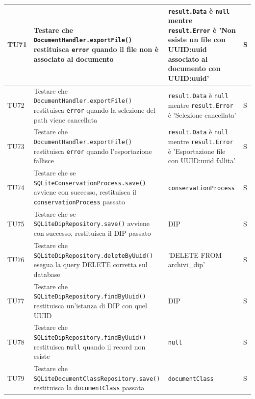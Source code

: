 \documentclass[a4paper,12pt]{article}
\begin{document}
\begin{longtable}{|M{1.2cm}|M{5cm}|M{7cm}|M{1.5cm}|}
            TU71 & Testare che \texttt{DocumentHandler.exportFile()} restituisca \texttt{error} quando il file non è associato al documento & \texttt{result.Data} è \texttt{null} mentre \texttt{result.Error} è 'Non esiste un file con UUID:uuid associato al documento con UUID:uuid' & S \\
            \hline

            TU72 & Testare che \texttt{DocumentHandler.exportFile()} restituisca \texttt{error} quando la selezione del path viene cancellata & \texttt{result.Data} è \texttt{null} mentre \texttt{result.Error} è 'Selezione cancellata' & S \\
            \hline

            TU73 & Testare che \texttt{DocumentHandler.exportFile()} restituisca \texttt{error} quando l'esportazione fallisce & \texttt{result.Data} è \texttt{null} mentre \texttt{result.Error} è 'Esportazione file con UUID:uuid fallita' & S \\
            \hline


            TU74 & Testare che se \texttt{SQLiteConservationProcess.save()} avviene con successo, restituisca il \texttt{conservationProcess} passato & \texttt{conservationProcess} & S \\
            \hline

            TU75 & Testare che se \texttt{SQLiteDipRepository.save()} avviene con successo, restituisca il DIP passato & DIP & S \\
            \hline

            TU76 & Testare che \texttt{SQLiteDipRepository.deleteByUuid()} esegua la query DELETE corretta sul database & 'DELETE FROM archivi\_dip' & S \\
            \hline

            TU77 & Testare che \texttt{SQLiteDipRepository.findByUuid()} restituisca un'istanza di DIP con quel UUID & DIP & S \\
            \hline

            TU78 & Testare che \texttt{SQLiteDipRepository.findByUuid()} restituisca \texttt{null} quando il record non esiste & \texttt{null} & S \\
            \hline

            TU79 & Testare che \texttt{SQLiteDocumentClassRepository.save()} restituisca la \texttt{documentClass} passata & \texttt{documentClass} & S \\
            \hline


\end{longtable}
\end{document}
